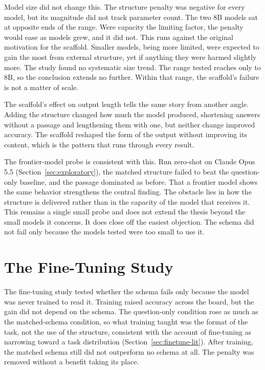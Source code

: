 \documentclass[master]{thesis}
\newcommand{\sref}[1]{Section~\ref{#1}}  %
\begin{document}
Model size did not change this. The structure penalty was negative for every model, but its magnitude did not track parameter count. The two 8B models sat at opposite ends of the range. Were capacity the limiting factor, the penalty would ease as models grew, and it did not. This runs against the original motivation for the scaffold. Smaller models, being more limited, were expected to gain the most from external structure, yet if anything they were harmed slightly more. The study found no systematic size trend. The range tested reaches only to 8B, so the conclusion extends no further. Within that range, the scaffold's failure is not a matter of scale.

The scaffold's effect on output length tells the same story from another angle. Adding the structure changed how much the model produced, shortening answers without a passage and lengthening them with one, but neither change improved accuracy. The scaffold reshaped the form of the output without improving its content, which is the pattern that runs through every result.

The frontier-model probe is consistent with this. Run zero-shot on Claude Opus 5.5 (\sref{sec:exploratory}), the matched structure failed to beat the question-only baseline, and the passage dominated as before. That a frontier model shows the same behavior strengthens the central finding. The obstacle lies in how the structure is delivered rather than in the capacity of the model that receives it. This remains a single small probe and does not extend the thesis beyond the small models it concerns. It does close off the easiest objection. The schema did not fail only because the models tested were too small to use it.

\section{The Fine-Tuning Study}

The fine-tuning study tested whether the schema fails only because the model was never trained to read it. Training raised accuracy across the board, but the gain did not depend on the schema. The question-only condition rose as much as the matched-schema condition, so what training taught was the format of the task, not the use of the structure, consistent with the account of fine-tuning as narrowing toward a task distribution (\sref{sec:finetune-lit}). After training, the matched schema still did not outperform no schema at all. The penalty was removed without a benefit taking its place.
\end{document}
